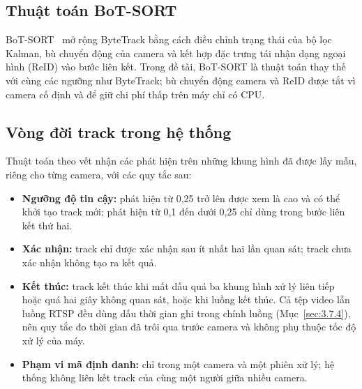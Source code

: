 \subsection{Thuật toán BoT-SORT}
\label{sec:3.3.4}

BoT-SORT~\cite{aharon2022botsort} mở rộng ByteTrack bằng cách điều chỉnh trạng thái của bộ lọc Kalman, bù chuyển động của camera và kết hợp đặc trưng tái nhận dạng ngoại hình (ReID) vào bước liên kết. Trong đề tài, BoT-SORT là thuật toán thay thế với cùng các ngưỡng như ByteTrack; bù chuyển động camera và ReID được tắt vì camera cố định và để giữ chi phí thấp trên máy chỉ có CPU.

\subsection{Vòng đời track trong hệ thống}
\label{sec:3.3.5}

Thuật toán theo vết nhận các phát hiện trên những khung hình đã được lấy mẫu, riêng cho từng camera, với các quy tắc sau:
\begin{itemize}
    \item \textbf{Ngưỡng độ tin cậy:} phát hiện từ 0,25 trở lên được xem là cao và có thể khởi tạo track mới; phát hiện từ 0,1 đến dưới 0,25 chỉ dùng trong bước liên kết thứ hai.
    \item \textbf{Xác nhận:} track chỉ được xác nhận sau ít nhất hai lần quan sát; track chưa xác nhận không tạo ra kết quả.
    \item \textbf{Kết thúc:} track kết thúc khi mất dấu quá ba khung hình xử lý liên tiếp hoặc quá hai giây không quan sát, hoặc khi luồng kết thúc. Cả tệp video lẫn luồng RTSP đều dùng dấu thời gian ghi trong chính luồng (Mục~\ref{sec:3.7.4}), nên quy tắc đo thời gian đã trôi qua trước camera và không phụ thuộc tốc độ xử lý của máy.
    \item \textbf{Phạm vi mã định danh:} chỉ trong một camera và một phiên xử lý; hệ thống không liên kết track của cùng một người giữa nhiều camera.
\end{itemize}
